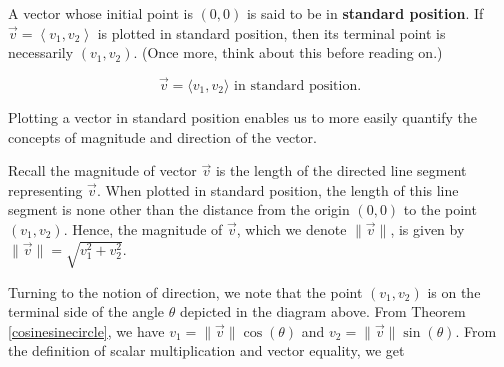 \documentclass{ximera}
\begin{document}
A vector whose initial point is $(0,0)$ is said to be in   \textbf{standard position}.  If $\overrightarrow{v} = \left<v_1,v_2\right>$ is plotted in standard position, then its terminal point is necessarily $\left(v_1,v_2\right)$. (Once more, think about this before reading on.)  

\begin{center}

\[
\overrightarrow{v}=\langle v_1,v_2\rangle
\text{ in standard position.}
\]
\end{center}

\label{polarformvectorsection} 

Plotting a vector in standard position enables us to more easily quantify the concepts of magnitude and direction of the vector. 

 

Recall the magnitude of vector $\overrightarrow{v}$ is the length of the directed line segment representing $\overrightarrow{v}$.   When plotted in standard position, the length of this line segment  is none other than the distance from the origin $(0,0)$ to the point $\left(v_1,v_2\right)$.  Hence, the magnitude of $\overrightarrow{v}$, which we denote $\| \overrightarrow{v} \|$, is given by $\| \overrightarrow{v} \| = \sqrt{v_1^2 + v_2^2}$.

 

Turning to the notion of direction, we note that the point  $\left(v_1,v_2\right)$ is on the terminal side of the angle $\theta$ depicted in the diagram above.   From Theorem \ref{cosinesinecircle}, we have $v_1 = \| \overrightarrow{v} \| \cos(\theta)$ and $v_2  =  \| \overrightarrow{v} \| \sin(\theta)$. From the definition of scalar multiplication and vector equality, we get
\end{document}
